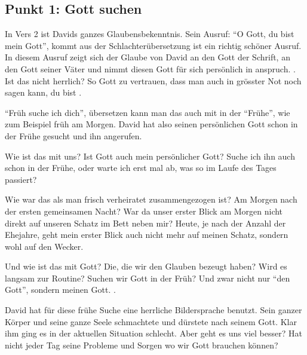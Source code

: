 \documentclass[14pt]{../../inc/mybib}
\begin{document}
    \subsection*{Punkt 1: Gott suchen}
    \begin{block}
    In Vers 2 ist Davids ganzes Glaubensbekenntnis. Sein Ausruf: \enquote{O Gott, du bist mein Gott}, kommt aus der Schlachterübersetzung ist ein richtig schöner Ausruf. In diesem Ausruf zeigt sich der Glaube von David an den Gott der Schrift, an den Gott seiner Väter und nimmt diesen Gott für sich persönlich in anspruch. . Ist das nicht herrlich? So  Gott zu vertrauen, dass man auch in grösster Not noch sagen kann, du bist . 

    \enquote{Früh suche ich dich}, übersetzen kann man das auch mit in der \enquote{Frühe},  wie zum Beispiel früh am Morgen. David hat also seinen persönlichen Gott schon in der Frühe gesucht und ihn angerufen.
    \end{block}

    \begin{block}
        Wie ist das mit uns? Ist Gott auch mein persönlicher Gott? Suche ich ihn auch schon in der Frühe, oder warte ich erst mal ab, was so im Laufe des Tages passiert?

        Wie war das als man frisch verheiratet zusammengezogen ist? Am Morgen nach der ersten gemeinsamen Nacht? War da unser erster Blick am Morgen nicht direkt auf unseren Schatz im Bett neben mir? Heute, je nach der Anzahl der Ehejahre, geht mein erster Blick auch nicht mehr auf meinen Schatz, sondern wohl auf den Wecker.

        Und wie ist das mit  Gott? Die, die wir den Glauben bezeugt haben? Wird es langsam zur Routine? Suchen wir Gott in der Früh? Und zwar nicht nur \enquote{den Gott}, sondern meinen Gott. .

        David hat für diese frühe Suche eine herrliche Bildersprache benutzt.  Sein ganzer Körper und seine ganze Seele schmachtete und dürstete nach seinem Gott. Klar ihm ging es in der aktuellen Situation schlecht. Aber geht es uns viel besser? Hat nicht jeder Tag seine Probleme und Sorgen wo wir Gott brauchen können?

    \end{block}
\end{document}
